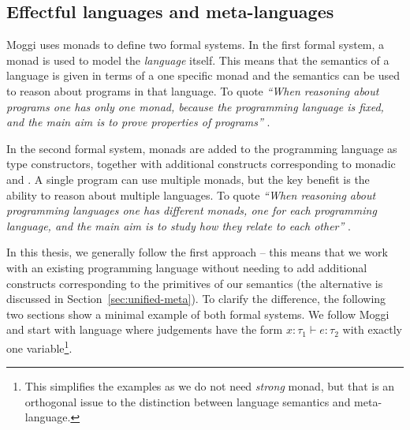 
\subsection{Effectful languages and meta-languages}
\label{sec:path-sem-langs}

Moggi uses monads to define two formal systems. In the first formal system, a monad is used to model 
the \emph{language} itself. This means that the semantics of a language is given in terms of a 
one specific monad and the semantics can be used to reason about programs in that language. To quote 
\emph{``When reasoning about programs one has only one monad, because the programming language is 
fixed, and the main aim is to prove properties of programs''} \cite[p. 5]{monad-notions}.

In the second formal system, monads are added to the programming language as type constructors, 
together with additional constructs corresponding to monadic  and .
A single program can use multiple monads, but the key benefit is the ability to reason
about multiple languages. To quote \emph{``When reasoning about programming languages one has different 
monads, one for each programming language, and the main aim is to study how they relate to each 
other''} \cite[p. 5]{monad-notions}.

In this thesis, we generally follow the first approach -- this means that we work with an existing
programming language without needing to add additional constructs corresponding to the primitives
of our semantics (the alternative is discussed in Section~\ref{sec:unified-meta}). To clarify the 
difference, the following two sections show a minimal example of both formal systems. We follow 
Moggi and start with language where judgements have the form $x\!:\!\tau_1 \vdash e : \tau_2$ with 
exactly one variable\footnote{This simplifies the examples as we do not need \emph{strong} monad, 
but that is an orthogonal issue to the distinction between language semantics and meta-language.}.


